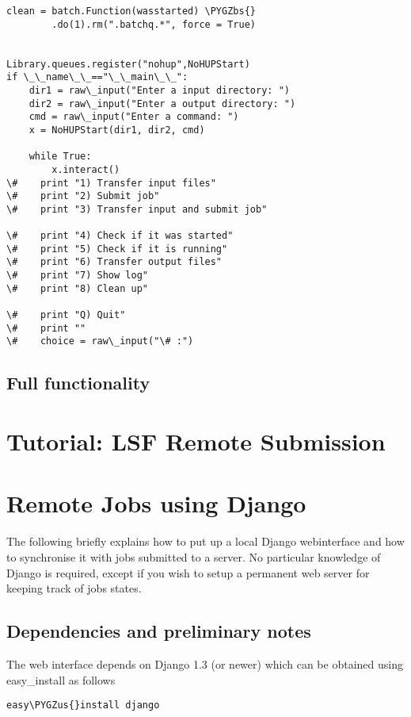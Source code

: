\documentclass[letterpaper,10pt,english]{sphinxmanual}
\def\PYGZbs{\char`\\}
\def\PYGZus{\char`\_}
\begin{document}
\begin{Verbatim}[commandchars=\\\{\}]
    clean = batch.Function(wasstarted) \PYGZbs{}
        .do(1).rm(".batchq.*", force = True)


Library.queues.register("nohup",NoHUPStart)
if \_\_name\_\_=="\_\_main\_\_":
    dir1 = raw\_input("Enter a input directory: ")
    dir2 = raw\_input("Enter a output directory: ")
    cmd = raw\_input("Enter a command: ")
    x = NoHUPStart(dir1, dir2, cmd)
    
    while True:
        x.interact()
\#    print "1) Transfer input files"
\#    print "2) Submit job"
\#    print "3) Transfer input and submit job"

\#    print "4) Check if it was started"
\#    print "5) Check if it is running"
\#    print "6) Transfer output files"
\#    print "7) Show log"
\#    print "8) Clean up"

\#    print "Q) Quit"
\#    print ""
\#    choice = raw\_input("\# :")
\end{Verbatim}


\section{Full functionality}
\label{tutorial_nhup:full-functionality}

\chapter{Tutorial: LSF Remote Submission}
\label{tutorial_bsub:tutorial-lsf-remote-submission}\label{tutorial_bsub::doc}

\chapter{Remote Jobs using Django}
\label{webinterface:remote-jobs-using-django}\label{webinterface::doc}
The following briefly explains how to put up a local Django webinterface
and how to synchronise it with jobs submitted to a server. No particular
knowledge of Django is required, except if you wish to setup a permanent
web server for keeping track of jobs states.


\section{Dependencies and preliminary notes}
\label{webinterface:dependencies-and-preliminary-notes}
The web interface depends on Django 1.3 (or newer) which can be
obtained using easy\_install as follows

\begin{Verbatim}[commandchars=\\\{\}]
easy\PYGZus{}install django
\end{Verbatim}
\end{document}
